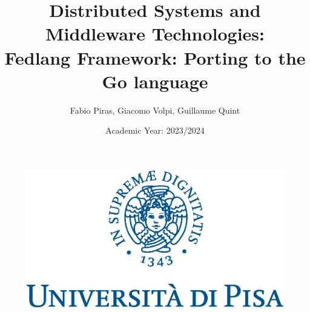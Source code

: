 \documentclass[a4paper, openright]{report}
\author{Fabio Piras, Giacomo Volpi, Guillaume Quint}
\title{Distributed Systems and Middleware Technologies:\\
Fedlang Framework: Porting to the Go language}
\date{Academic Year: 2023/2024}
\begin{document}
\begin{figure}
\centering

\includegraphics[scale=0.75]{./images/cherubino}

\end{figure}
\maketitle
\thispagestyle{empty}
\newpage

\tableofcontents


\thispagestyle{empty}




\end{document}
